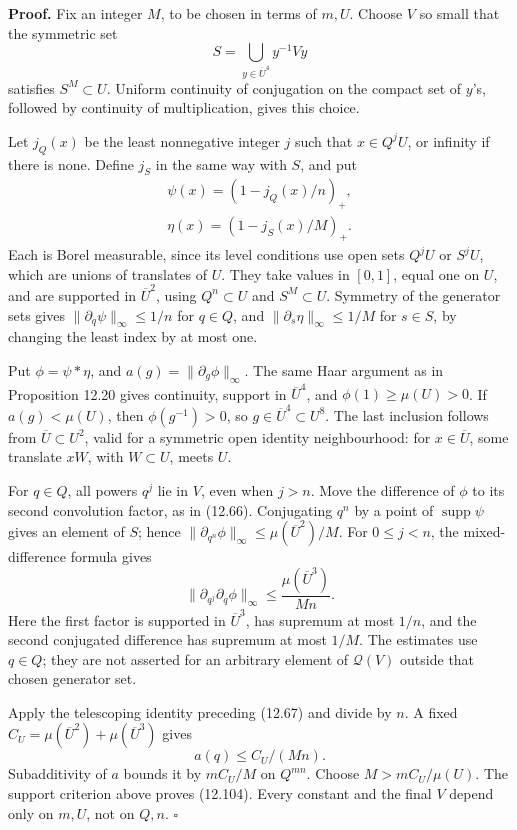 \documentclass[
  11pt,
]{article}
\begin{document}
\textbf{Proof.} Fix an integer \(M\), to be chosen in terms of \(m,U\).
Choose \(V\) so small that the symmetric set \[
S=\bigcup_{y\in\overline U^4}y^{-1}Vy
\tag{12.105}
\] satisfies \(S^M\subset U\). Uniform continuity of conjugation on the
compact set of \(y\)'s, followed by continuity of multiplication, gives
this choice.

Let \(j_Q(x)\) be the least nonnegative integer \(j\) such that
\(x\in Q^jU\), or infinity if there is none. Define \(j_S\) in the same
way with \(S\), and put \[
\begin{gathered}
\psi(x)=(1-j_Q(x)/n)_+,\\
\eta(x)=(1-j_S(x)/M)_+.
\end{gathered}
\tag{12.106}
\] Each is Borel measurable, since its level conditions use open sets
\(Q^jU\) or \(S^jU\), which are unions of translates of \(U\). They take
values in \([0,1]\), equal one on \(U\), and are supported in
\(\overline U^2\), using \(Q^n\subset U\) and \(S^M\subset U\). Symmetry
of the generator sets gives \(\|\partial_q\psi\|_\infty\leq1/n\) for
\(q\in Q\), and \(\|\partial_s\eta\|_\infty\leq1/M\) for \(s\in S\), by
changing the least index by at most one.

Put \(\phi=\psi*\eta\), and \(a(g)=\|\partial_g\phi\|_\infty\). The same
Haar argument as in Proposition 12.20 gives continuity, support in
\(\overline U^4\), and \(\phi(1)\geq\mu(U)>0\). If \(a(g)<\mu(U)\), then
\(\phi(g^{-1})>0\), so \(g\in\overline U^4\subset U^8\). The last
inclusion follows from \(\overline U\subset U^2\), valid for a symmetric
open identity neighbourhood: for \(x\in\overline U\), some translate
\(xW\), with \(W\subset U\), meets \(U\).

For \(q\in Q\), all powers \(q^j\) lie in \(V\), even when \(j>n\). Move
the difference of \(\phi\) to its second convolution factor, as in
(12.66). Conjugating \(q^n\) by a point of \(\operatorname{supp}\psi\)
gives an element of \(S\); hence
\(\|\partial_{q^n}\phi\|_\infty\leq\mu(\overline U^2)/M\). For
\(0\leq j<n\), the mixed-difference formula gives \[
\|\partial_{q^j}\partial_q\phi\|_\infty
\leq\frac{\mu(\overline U^3)}{Mn}.
\tag{12.107}
\] Here the first factor is supported in \(\overline U^3\), has supremum
at most \(1/n\), and the second conjugated difference has supremum at
most \(1/M\). The estimates use \(q\in Q\); they are not asserted for an
arbitrary element of \(\mathcal Q(V)\) outside that chosen generator
set.

Apply the telescoping identity preceding (12.67) and divide by \(n\). A
fixed \(C_U=\mu(\overline U^2)+\mu(\overline U^3)\) gives \[
a(q)\leq C_U/(Mn).
\tag{12.108}
\] Subadditivity of \(a\) bounds it by \(mC_U/M\) on \(Q^{mn}\). Choose
\(M>mC_U/\mu(U)\). The support criterion above proves (12.104). Every
constant and the final \(V\) depend only on \(m,U\), not on \(Q,n\).
\(\square\)
\end{document}
